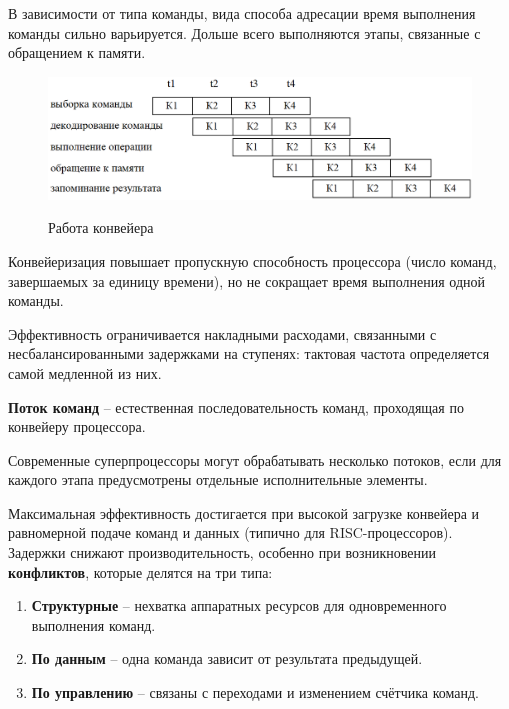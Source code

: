 	В зависимости от типа команды, вида способа адресации время выполнения 
	команды сильно варьируется. Дольше всего выполняются этапы, связанные с 
	обращением к памяти.
	
	\vspace{-1em}
	\begin{figure}[H]
		\centering
		\includegraphics[width=1\linewidth, height=0.175\textheight]{img/01_02}
		\par
		{\small Работа конвейера}
		\label{fig:01_02}
	\end{figure}
	\vspace{-1em}
	
	Конвейеризация повышает пропускную способность процессора (число команд, завершаемых за единицу времени), но не сокращает время выполнения одной команды. 
	\par 
	Эффективность ограничивается накладными расходами, связанными с несбалансированными задержками на ступенях: тактовая частота определяется самой медленной из них.
	
	\par\vspace{0.5em}
	\textbf{Поток команд} -- естественная последовательность команд, проходящая по конвейеру процессора. 
	\par
	Современные суперпроцессоры могут обрабатывать несколько потоков, если для каждого этапа предусмотрены отдельные исполнительные элементы.
	\par\vspace{0.5em}
	
	Максимальная эффективность достигается при высокой загрузке конвейера и равномерной подаче команд и данных (типично для RISC-процессоров). Задержки снижают производительность, особенно при возникновении \textbf{конфликтов}, которые делятся на три типа:
	
	\begin{enumerate}
		\item \textbf{Структурные} -- нехватка аппаратных ресурсов для одновременного выполнения команд.
		\item \textbf{По данным} -- одна команда зависит от результата предыдущей.
		\item \textbf{По управлению} -- связаны с переходами и изменением счётчика команд.
	\end{enumerate}
	
